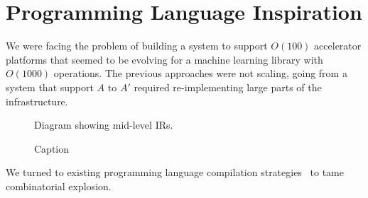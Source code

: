 \section{Programming Language Inspiration}

We were facing the problem of building a system to support $O(100)$ accelerator platforms that seemed to be evolving for a machine learning library with $O(1000)$ operations. The previous approaches were not scaling, going from a system that support $A$ to $A'$ required re-implementing large parts of the infrastructure.

\begin{figure}
    \centering
    Diagram showing mid-level IRs.
    \caption{Caption}
    \label{fig:pl-midlevel}
\end{figure}

We turned to existing programming language compilation strategies~ to tame combinatorial explosion.